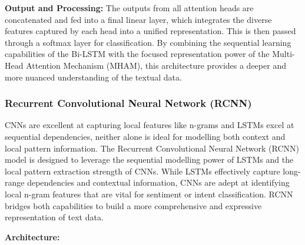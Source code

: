 \documentclass{article}
\begin{document}
\textbf{Output and Processing:}
The outputs from all attention heads are concatenated and fed into a final linear layer, which integrates the diverse features captured by each head into a unified representation. This is then passed through a softmax layer for classification. By combining the sequential learning capabilities of the Bi-LSTM with the focused representation power of the Multi-Head Attention Mechanism (MHAM), this architecture provides a deeper and more nuanced understanding of the textual data.


\subsubsection{Recurrent Convolutional Neural Network (RCNN)}

CNNs are excellent at capturing local features like n-grams and LSTMs excel at sequential dependencies, neither alone is ideal for modelling both context and local pattern information. The Recurrent Convolutional Neural Network (RCNN) model is designed to leverage the sequential modelling power of LSTMs and the local pattern extraction strength of CNNs. While LSTMs effectively capture long-range dependencies and contextual information, CNNs are adept at identifying local n-gram features that are vital for sentiment or intent classification. RCNN bridges both capabilities to build a more comprehensive and expressive representation of text data.


\textbf{Architecture:}
\end{document}
